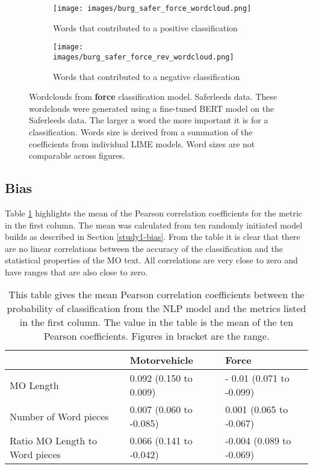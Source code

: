 \begin{figure}
     \centering
     \begin{subfigure}[b]{0.9\textwidth}
         \centering
         \texttt{[image: images/burg\_safer\_force\_wordcloud.png]}
         \caption{Words that contributed to a positive classification}
         \label{fig: wordcloud_force}
     \end{subfigure}
     \vfill
     \begin{subfigure}[b]{0.9\textwidth}
         \centering
         \texttt{[image: images/burg\_safer\_force\_rev\_wordcloud.png]}
         \caption{Words that contributed to a negative classification}
         \label{fig: wordcloud_mv_force}
     \end{subfigure}
        \caption{{Wordclouds from \textbf{force} classification model. Saferleeds data.} These wordclouds were generated using a fine-tuned BERT model on the Saferleeds data. The larger a word the more important it is for a classification. Words size is derived from a summation of the coefficients from individual LIME models. Word sizes are not comparable across figures.}
        \label{fig:wordcloud_mv_both}
        
\end{figure}

\subsection{Bias} Table \ref{tab:saferleeds_bias} highlights the mean of the Pearson correlation coefficients for the metric in the first column. The mean was calculated from ten randomly initiated model builds as described in Section \ref{study1-bias}. From the table it is clear that there are no linear correlations between the accuracy of the classification and the statistical properties of the MO text. All correlations are very close to zero and have ranges that are also close to zero.


\begin{table}[]
\begin{tabular}{@{}lll@{}}
\toprule
                               & Motorvehicle            & Force                    \\ \midrule
MO Length                      & 0.092 (0.150 to 0.009)  & - 0.01 (0.071 to -0.099) \\
Number of Word pieces          & 0.007 (0.060 to -0.085) & 0.001 (0.065 to -0.067)  \\
Ratio MO Length to Word pieces & 0.066 (0.141 to -0.042) & -0.004 (0.089 to -0.069) \\ \bottomrule
\end{tabular}

\caption{\label{tab:saferleeds_bias} This table gives the mean Pearson correlation coefficients between the probability of classification from the NLP model and the metrics listed in the first column.  The value in the table is the mean of the ten Pearson coefficients. Figures in bracket are the range.}
\end{table}





